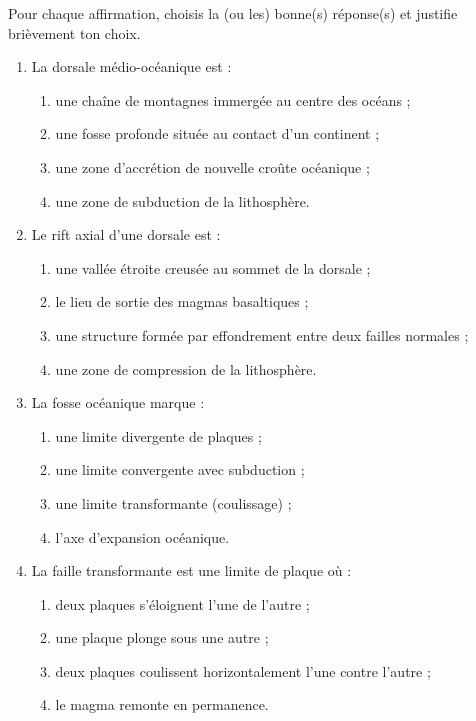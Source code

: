 \documentclass[11pt]{article}
\begin{document}
\begin{exercice}
Pour chaque affirmation, choisis la (ou les) bonne(s) réponse(s) et justifie brièvement ton choix.
\begin{enumerate}
\item La dorsale médio-océanique est :
\begin{enumerate}
\item une chaîne de montagnes immergée au centre des océans ;
\item une fosse profonde située au contact d'un continent ;
\item une zone d'accrétion de nouvelle croûte océanique ;
\item une zone de subduction de la lithosphère.
\end{enumerate}
\item Le rift axial d'une dorsale est :
\begin{enumerate}
\item une vallée étroite creusée au sommet de la dorsale ;
\item le lieu de sortie des magmas basaltiques ;
\item une structure formée par effondrement entre deux failles normales ;
\item une zone de compression de la lithosphère.
\end{enumerate}
\item La fosse océanique marque :
\begin{enumerate}
\item une limite divergente de plaques ;
\item une limite convergente avec subduction ;
\item une limite transformante (coulissage) ;
\item l'axe d'expansion océanique.
\end{enumerate}
\item La faille transformante est une limite de plaque où :
\begin{enumerate}
\item deux plaques s'éloignent l'une de l'autre ;
\item une plaque plonge sous une autre ;
\item deux plaques coulissent horizontalement l'une contre l'autre ;
\item le magma remonte en permanence.
\end{enumerate}
\end{enumerate}
\end{exercice}
\end{document}
